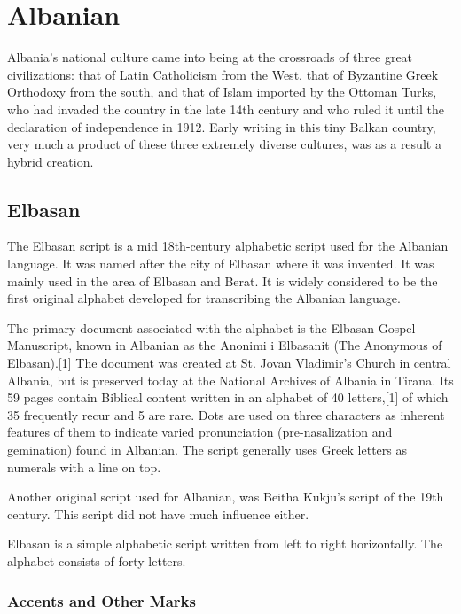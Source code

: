 \chapter{Albanian}

Albania's national culture came into being at the crossroads of three great civilizations:
that of Latin Catholicism from the West, that of Byzantine Greek Orthodoxy from the south, and
that of Islam imported by the Ottoman Turks, who had invaded the country in the late 14th
century and who ruled it until the declaration of independence in 1912. Early writing in this tiny
Balkan country, very much a product of these three extremely diverse cultures, was as a result a
hybrid creation. 

\section{Elbasan}
\label{s:elbasan}
\newfontfamily{}
The Elbasan script is a mid 18th-century alphabetic script used for the Albanian language. It was named after the city of Elbasan where it was invented. It was mainly used in the area of Elbasan and Berat. It is widely considered to be the first original alphabet developed for transcribing the Albanian language.

The primary document associated with the alphabet is the Elbasan Gospel Manuscript, known in Albanian as the Anonimi i Elbasanit (The Anonymous of Elbasan).[1] The document was created at St. Jovan Vladimir's Church in central Albania, but is preserved today at the National Archives of Albania in Tirana. Its 59 pages contain Biblical content written in an alphabet of 40 letters,[1] of which 35 frequently recur and 5 are rare. Dots are used on three characters as inherent features of them to indicate varied pronunciation (pre-nasalization and gemination) found in Albanian. The script generally uses Greek letters as numerals with a line on top.

Another original script used for Albanian, was Beitha Kukju's script of the 19th century. This script did not have much influence either.

Elbasan is a simple alphabetic script written from left to right horizontally. The alphabet consists of forty letters.

\subsection{Accents and Other Marks}

